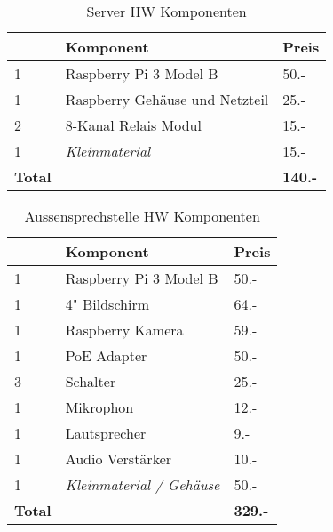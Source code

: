 \begin{table}[]
	\centering
	\label{my-label}
	\begin{tabular}{l|ll}
		\multicolumn{1}{r|}{} \textbf{Anzahl} & \textbf{Komponent} \hspace{180pt} & \textbf{Preis} 	\\ \hline
		1	&	Raspberry Pi 3 Model B						& 50.-				\\ \hline
		1	&	Raspberry Gehäuse und Netzteil				& 25.-			\\ \hline
		2	&	8-Kanal Relais Modul						& 15.-			\\ \hline
		1	&	\textit{Kleinmaterial}						& 15.-			\\ \hline
		\textbf{Total}	&									& \textbf{140.-}			\\ \hline
	\end{tabular}
	\caption{Server HW Komponenten}
	\label{tbl:SrvHW}
\end{table}

\begin{table}[]
	\centering
	\label{my-label}
	\begin{tabular}{l|ll}
		\multicolumn{1}{r|}{} \textbf{Anzahl} & \textbf{Komponent} \hspace{180pt} & \textbf{Preis} 	\\ \hline
		1	&	Raspberry Pi 3 Model B		   				& 50.-			\\ \hline
		1	&	4" Bildschirm								& 64.-			\\ \hline
		1	&	Raspberry Kamera							& 59.-			\\ \hline
		1	&	PoE Adapter									& 50.-			\\ \hline
		3	&	Schalter									& 25.-			\\ \hline
		1	&	Mikrophon									& 12.-			\\ \hline
		1	&	Lautsprecher								& 9.-			\\ \hline
		1	&	Audio Verstärker							& 10.-			\\ \hline
		1	&	\textit{Kleinmaterial / Gehäuse}			& 50.-			\\ \hline
		\textbf{Total}	&									& \textbf{329.-}			\\ \hline
	\end{tabular}
	\caption{Aussensprechstelle HW Komponenten}
	\label{tbl:DoorHW}
\end{table}

